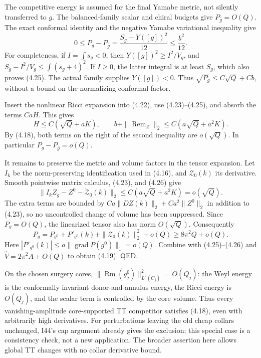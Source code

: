 \documentclass[
  11pt,
]{article}
\begin{document}
The competitive energy is assumed for the final Yamabe metric, not
silently transferred to \(g\). The balanced-family scalar and chiral
budgets give \(P_{\widehat g}=O(Q)\). The exact conformal identity and
the negative Yamabe variational inequality give \[
 0\le P_g-P_{\widehat g}
       =\frac{S_g-Y([g])^2}{12}\le\frac{b^2}{12}. \tag{4.25}
\] For completeness, if \(I=\int s_g<0\), then \(Y([g])^2\ge I^2/V_g\),
and \(S_g-I^2/V_g\le\int(s_g+4)^2\). If \(I\ge0\), the latter integral
is at least \(S_g\), which also proves (4.25). The actual family
supplies \(Y([g])<0\). Thus \(\sqrt{P_g}\le C\sqrt Q+Cb\), without a
bound on the normalizing conformal factor.

Insert the nonlinear Ricci expansion into (4.22), use (4.23)--(4.25),
and absorb the terms \(CaH\). This gives \[
 H\le C(\sqrt Q+aK),\qquad
 b+\|\operatorname{Rem}_Z\|_2
                  \le C(a\sqrt Q+a^2K). \tag{4.26}
\] By (4.18), both terms on the right of the second inequality are
\(o(\sqrt Q)\). In particular \(P_g-P_{\widehat g}=o(Q)\).

It remains to preserve the metric and volume factors in the tensor
expansion. Let \(I_k\) be the norm-preserving identification used in
(4.16), and \(\dot{\mathcal Z}_0(k)\) its derivative. Smooth pointwise
matrix calculus, (4.23), and (4.26) give \[
 \|I_k Z_g-Z^0-\dot{\mathcal Z}_0(k)\|_2
       \le C(a\sqrt Q+a^2K)=o(\sqrt Q).
 \tag{4.27}
\] The extra terms are bounded by \(Ca\|DZ(k)\|_2+Ca^2\|Z^0\|_2\) in
addition to (4.23), so no uncontrolled change of volume has been
suppressed. Since \(P_g=O(Q)\), the linearized tensor also has norm
\(O(\sqrt Q)\). Consequently \[
 P_g=P_{g^0}+P'_{g^0}(k)
                 +\|\dot{\mathcal Z}_0(k)\|_2^2+o(Q)
        \ge8\pi^2Q+o(Q).
 \tag{4.28}
\] Here \(|P'_{g^0}(k)|\le a\|\operatorname{grad}P(g^0)\|_1=o(Q)\).
Combine with (4.25)--(4.26) and \(\widehat V=2\pi^2A+O(Q)\) to obtain
(4.19). QED.

On the chosen surgery cores,
\(\|\operatorname{Rm}(g_j^0)\|_{L^2(C_j)}^2=O(Q_j)\): the Weyl energy is
the conformally invariant donor-and-annulus energy, the Ricci energy is
\(O(Q_j)\), and the scalar term is controlled by the core volume. Thus
every vanishing-amplitude core-supported TT competitor satisfies (4.18),
even with arbitrarily high derivatives. For perturbations leaving the
old cheap collars unchanged, I44's cap argument already gives the
exclusion; this special case is a consistency check, not a new
application. The broader assertion here allows global TT changes with no
collar derivative bound.
\end{document}
